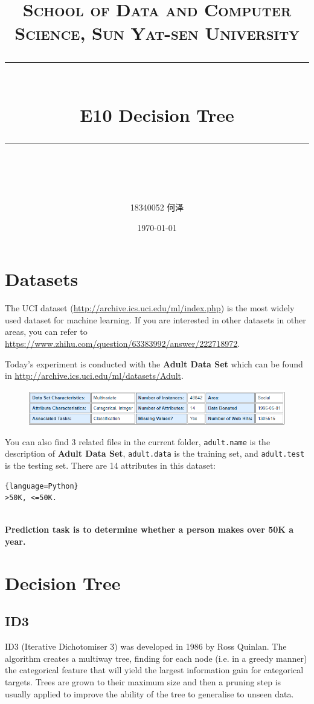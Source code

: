 \documentclass[a4paper, 11pt]{article}
\title{	
\normalfont \normalsize
\textsc{School of Data and Computer Science, Sun Yat-sen University} \\ [25pt] %
\rule{\textwidth}{0.5pt} \\[0.4cm] %
\huge  E10 Decision Tree \\ %
\rule{\textwidth}{2pt} \\[0.5cm] %
\author{18340052  何泽}
\date{\normalsize\today}
}
\begin{document}
\maketitle
\tableofcontents
\newpage

\section{Datasets}
\label{sec:datasets}

The UCI dataset (\url{http://archive.ics.uci.edu/ml/index.php}) is the most widely used dataset for machine learning. If you are interested in other datasets in other areas, you can refer to \url{https://www.zhihu.com/question/63383992/answer/222718972}.

Today's experiment is conducted with the \textbf{Adult Data Set} which can be found in \url{http://archive.ics.uci.edu/ml/datasets/Adult}. 
\begin{figure}[ht]
\centering
\includegraphics[width=17cm]{dataset.png}
\end{figure}

You can also find 3 related files in the current folder, \texttt{adult.name} is the description of \textbf{Adult Data Set}, \texttt{adult.data} is the training set, and \texttt{adult.test} is the testing set. There are 14 attributes in this dataset:
\begin{lstlisting}{language=Python}
>50K, <=50K.


\end{lstlisting}
\textbf{Prediction task is to determine whether a person makes over 50K a year.}

\section{Decision Tree}

\subsection{ID3}
ID3 (Iterative Dichotomiser 3) was developed in 1986 by Ross Quinlan. The algorithm creates a multiway tree, finding for each node (i.e. in a greedy manner) the categorical feature that will yield the largest information gain for categorical targets. Trees are grown to their maximum size and then a pruning step is usually applied to improve the ability of the tree to generalise to unseen data.
\end{document}
